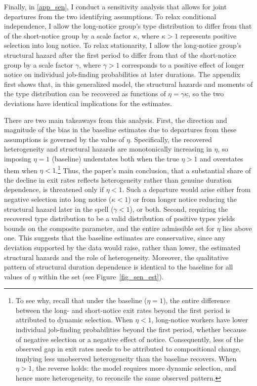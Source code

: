 \documentclass{div}
\begin{document}
Finally, in \ref{app_sen}, I conduct a sensitivity analysis that allows for joint departures from the two identifying assumptions. To relax conditional independence, I allow the long-notice group's type distribution to differ from that of the short-notice group by a scale factor $\kappa$, where $\kappa>1$ represents positive selection into long notice. To relax stationarity, I allow the long-notice group's structural hazard after the first period to differ from that of the short-notice group by a scale factor $\gamma$, where $\gamma>1$ corresponds to a positive effect of longer notice on individual job-finding probabilities at later durations. The appendix first shows that, in this generalized model, the structural hazards and moments of the type distribution can be recovered as functions of $\eta=\gamma\kappa$, so the two deviations have identical implications for the estimates.

There are two main takeaways from this analysis. First, the direction and magnitude of the bias in the baseline estimates due to departures from these assumptions is governed by the value of $\eta$. Specifically, the recovered heterogeneity and structural hazards are monotonically increasing in $\eta$, so imposing $\eta=1$ (baseline) understates both when the true $\eta>1$ and overstates them when $\eta<1$.\footnote{To see why, recall that under the baseline ($\eta=1$), the entire difference between the long- and short-notice exit rates beyond the first period is attributed to dynamic selection. When $\eta<1$, long-notice workers have lower individual job-finding probabilities beyond the first period, whether because of negative selection or a negative effect of notice. Consequently, less of the observed gap in exit rates needs to be attributed to compositional change, implying less unobserved heterogeneity than the baseline recovers. When $\eta>1$, the reverse holds: the model requires more dynamic selection, and hence more heterogeneity, to reconcile the same observed pattern.} Thus, the paper's main conclusion, that a substantial share of the decline in exit rates reflects heterogeneity rather than genuine duration dependence, is threatened only if $\eta<1$. Such a departure would arise either from negative selection into long notice ($\kappa<1$) or from longer notice reducing the structural hazard later in the spell ($\gamma<1$), or both. Second, requiring the recovered type distribution to be a valid distribution of positive types yields bounds on the composite parameter, and the entire admissible set for $\eta$ lies above one. This suggests that the baseline estimates are conservative, since any deviation supported by the data would raise, rather than lower, the estimated structural hazards and the role of heterogeneity. Moreover, the qualitative pattern of structural duration dependence is identical to the baseline for all values of $\eta$ within the set (see Figure~\ref{fig_sen_est}).
\end{document}
